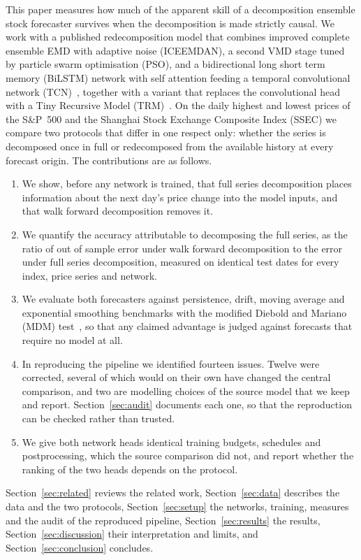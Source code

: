 This paper measures how much of the apparent skill of a decomposition ensemble
stock forecaster survives when the decomposition is made strictly causal. We
work with a published redecomposition model that combines improved complete
ensemble EMD with adaptive noise (ICEEMDAN), a second VMD stage tuned by
particle swarm optimisation (PSO), and a bidirectional long short term memory
(BiLSTM) network with self attention feeding a temporal convolutional network
(TCN)~\cite{gong2024}, together with a variant that replaces the convolutional
head with a Tiny Recursive Model (TRM)~\cite{jolicoeur2025}. On the daily
highest and lowest prices of the S\&P~500 and the Shanghai Stock Exchange
Composite Index (SSEC) we compare two protocols that differ in one respect
only: whether the series is decomposed once in full or redecomposed from the
available history at every forecast origin. The contributions are as follows.
\begin{enumerate}
\item We show, before any network is trained, that full series decomposition
places information about the next day's price change into the model inputs,
and that walk forward decomposition removes it.
\item We quantify the accuracy attributable to decomposing the full series,
as the ratio of out of sample error under walk forward decomposition to the
error under full series decomposition, measured on identical test dates for
every index, price series and network.
\item We evaluate both forecasters against persistence, drift, moving average
and exponential smoothing benchmarks with the modified Diebold and Mariano
(MDM) test~\cite{hewamalage2022,mdmindex2023}, so that any claimed advantage is
judged against forecasts that require no model at all.
\item In reproducing the pipeline we identified fourteen issues. Twelve were
corrected, several of which would on their own have changed the central
comparison, and two are modelling choices of the source model that we keep
and report. Section~\ref{sec:audit} documents each one, so that the
reproduction can be checked rather than trusted.
\item We give both network heads identical training budgets, schedules and
postprocessing, which the source comparison did not, and report whether the
ranking of the two heads depends on the protocol.
\end{enumerate}
Section~\ref{sec:related} reviews the related work, Section~\ref{sec:data}
describes the data and the two protocols, Section~\ref{sec:setup} the
networks, training, measures and the audit of the reproduced pipeline,
Section~\ref{sec:results} the results, Section~\ref{sec:discussion} their
interpretation and limits, and Section~\ref{sec:conclusion} concludes.

